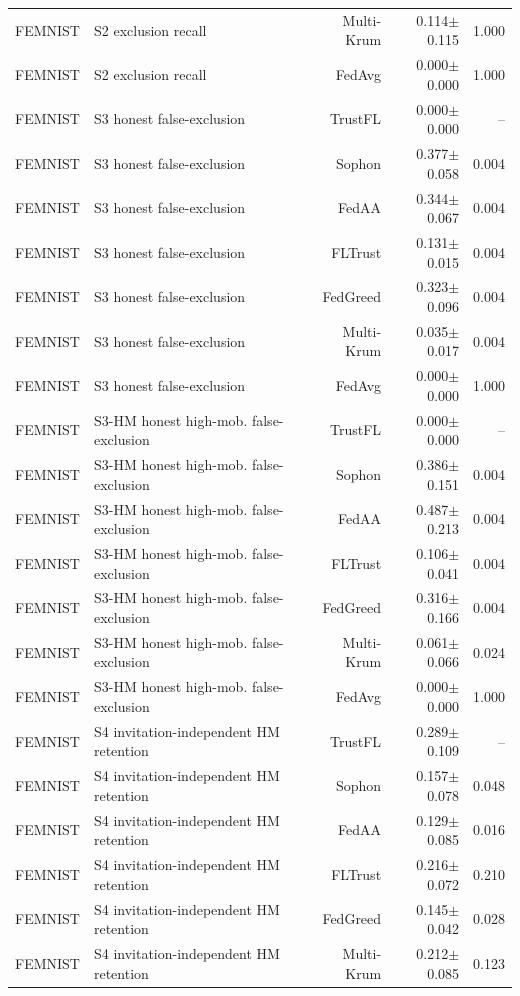 \begin{tabular}{llrrr}
FEMNIST & S2 exclusion recall & Multi-Krum & 0.114$\pm$0.115 & 1.000 \\
FEMNIST & S2 exclusion recall & FedAvg & 0.000$\pm$0.000 & 1.000 \\
FEMNIST & S3 honest false-exclusion & TrustFL & 0.000$\pm$0.000 & -- \\
FEMNIST & S3 honest false-exclusion & Sophon & 0.377$\pm$0.058 & 0.004 \\
FEMNIST & S3 honest false-exclusion & FedAA & 0.344$\pm$0.067 & 0.004 \\
FEMNIST & S3 honest false-exclusion & FLTrust & 0.131$\pm$0.015 & 0.004 \\
FEMNIST & S3 honest false-exclusion & FedGreed & 0.323$\pm$0.096 & 0.004 \\
FEMNIST & S3 honest false-exclusion & Multi-Krum & 0.035$\pm$0.017 & 0.004 \\
FEMNIST & S3 honest false-exclusion & FedAvg & 0.000$\pm$0.000 & 1.000 \\
FEMNIST & S3-HM honest high-mob. false-exclusion & TrustFL & 0.000$\pm$0.000 & -- \\
FEMNIST & S3-HM honest high-mob. false-exclusion & Sophon & 0.386$\pm$0.151 & 0.004 \\
FEMNIST & S3-HM honest high-mob. false-exclusion & FedAA & 0.487$\pm$0.213 & 0.004 \\
FEMNIST & S3-HM honest high-mob. false-exclusion & FLTrust & 0.106$\pm$0.041 & 0.004 \\
FEMNIST & S3-HM honest high-mob. false-exclusion & FedGreed & 0.316$\pm$0.166 & 0.004 \\
FEMNIST & S3-HM honest high-mob. false-exclusion & Multi-Krum & 0.061$\pm$0.066 & 0.024 \\
FEMNIST & S3-HM honest high-mob. false-exclusion & FedAvg & 0.000$\pm$0.000 & 1.000 \\
FEMNIST & S4 invitation-independent HM retention & TrustFL & 0.289$\pm$0.109 & -- \\
FEMNIST & S4 invitation-independent HM retention & Sophon & 0.157$\pm$0.078 & 0.048 \\
FEMNIST & S4 invitation-independent HM retention & FedAA & 0.129$\pm$0.085 & 0.016 \\
FEMNIST & S4 invitation-independent HM retention & FLTrust & 0.216$\pm$0.072 & 0.210 \\
FEMNIST & S4 invitation-independent HM retention & FedGreed & 0.145$\pm$0.042 & 0.028 \\
FEMNIST & S4 invitation-independent HM retention & Multi-Krum & 0.212$\pm$0.085 & 0.123 \\

\end{tabular}
